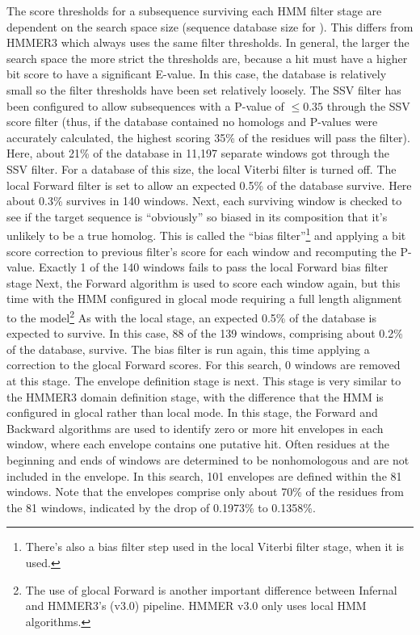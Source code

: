 The score thresholds for a subsequence surviving each HMM filter stage
are dependent on the search space size (sequence database size for
). This differs from HMMER3 which always uses the same
filter thresholds. In general, the larger the search
space the more strict the thresholds are, because a hit must have a
higher bit score to have a significant E-value.  In this case, the
database is relatively small so the filter thresholds have been set
relatively loosely. The SSV filter has been configured to allow
subsequences with a P-value of $\leq 0.35$ through
the SSV score filter (thus, if the database contained no homologs and
P-values were accurately calculated, the highest scoring 35\% of the
residues will pass the filter). Here, about 21\% of the database in
11,197 separate windows got through the SSV filter. For a database of
this size, the local Viterbi filter is turned off.  The local Forward filter
is set to allow an expected 0.5\% of the database survive. Here about
0.3\% survives in 140 windows. Next, each surviving window is checked
to see if the target sequence is ``obviously'' so biased in its
composition that it's unlikely to be a true homolog. This is called
the ``bias filter''\footnote{There's also a bias filter step used in
  the local Viterbi filter stage, when it is used.} and applying a bit
score correction to previous filter's score for each window and
recomputing the P-value. Exactly 1 of the 140 windows fails to pass
the local Forward bias filter stage Next, the Forward algorithm is
used to score each window again, but this time with the HMM configured
in glocal mode requiring a full length alignment to the
model\footnote{The use of glocal Forward is another important
  difference between Infernal and HMMER3's (v3.0) pipeline. HMMER v3.0
  only uses local HMM algorithms.}  As with the local stage, an
expected 0.5\% of the database is expected to survive. In this case,
88 of the 139 windows, comprising about 0.2\% of the database,
survive. The bias filter is run again, this time applying a correction
to the glocal Forward scores. For this search, 0 windows are removed at
this stage. The envelope definition stage is next. This stage is very
similar to the HMMER3 domain definition stage, with the difference
that the HMM is configured in glocal rather than local mode. In this
stage, the Forward and Backward algorithms are used to identify zero
or more hit envelopes in each window, where each envelope contains one
putative hit.  Often residues at the beginning and ends of windows are
determined to be nonhomologous and are not included in the
envelope. In this search, 101 envelopes are defined within the 81
windows. Note that the envelopes comprise only about 70\% of the
residues from the 81 windows, indicated by the drop of 0.1973\% to
0.1358\%.

